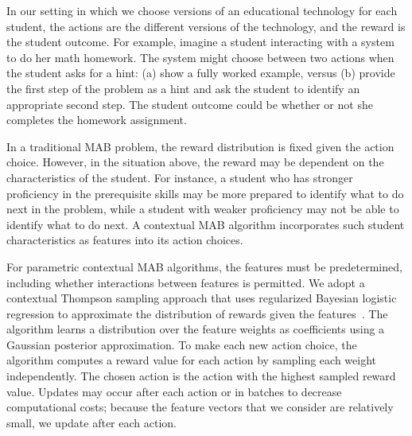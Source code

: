 In our setting in which we choose versions of an educational technology for each student, the actions are the different versions of the technology, and the reward is the student outcome. For example, imagine a student interacting with a system to do her math homework. The system might choose between two actions when the student asks for a hint: (a) show a fully worked example, versus (b) provide the first step of the problem as a hint and ask the student to identify an appropriate second step. The student outcome could be whether or not she completes the homework assignment. 

In a traditional MAB problem, the reward distribution is fixed given the action choice. However, in the situation above, the reward may be dependent on the characteristics of the student. For instance, a student who has stronger proficiency in the prerequisite skills may be more prepared to identify what to do next in the problem, while a student with weaker proficiency may not be able to identify what to do next. A contextual MAB algorithm incorporates such student characteristics as features into its action choices.

For parametric contextual MAB algorithms, the features must be predetermined, including whether interactions between features is permitted. 
We adopt a contextual Thompson sampling approach that uses regularized Bayesian logistic regression to approximate the distribution of rewards given the features~\cite{agrawal2013thompson,chapelle2011empirical}. The algorithm learns a distribution over the feature weights as coefficients using a Gaussian posterior approximation. To make each new action choice, the algorithm computes a reward value for each action by sampling each weight independently. The chosen action is the action with the highest sampled reward value. Updates may occur after each action or in batches to decrease computational costs; because the feature vectors that we consider are relatively small, we update after each action.


